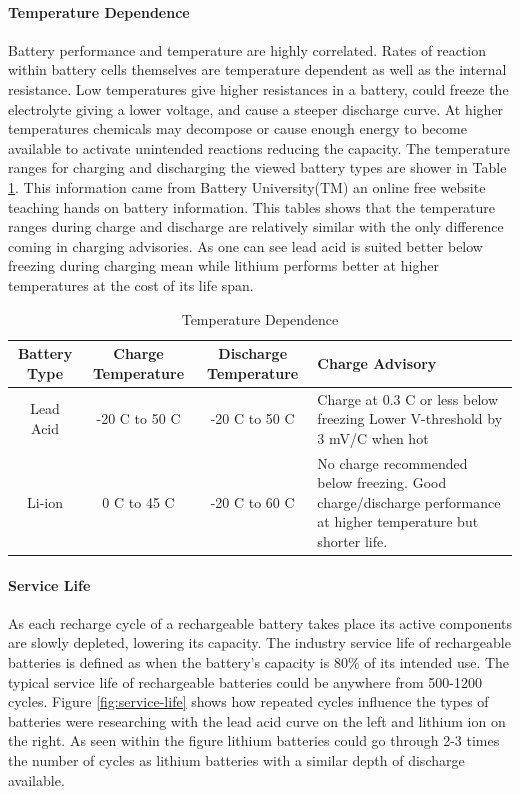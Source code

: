\paragraph{Temperature Dependence}
Battery performance and temperature are highly correlated. Rates of reaction within battery cells themselves are temperature dependent as well as the internal resistance. Low temperatures give higher resistances in a battery, could freeze the electrolyte giving a lower voltage, and cause a steeper discharge curve. At higher temperatures chemicals may decompose or cause enough energy to become available to activate unintended reactions reducing the capacity. The temperature ranges for charging and discharging the viewed battery types are shower in Table \ref{tab:temperature-dependence}. This information came from Battery University(TM) an online free website teaching hands on battery information. This tables shows that the temperature ranges during charge and discharge are relatively similar with the only difference coming in charging advisories. As one can see lead acid is suited better below freezing during charging mean while lithium performs better at higher temperatures at the cost of its life span. 
\begin{table}
\centering\scriptsize
\caption{Temperature Dependence}
\begin{tabularx}{\linewidth}{|c|c|c|X|}
\hline
Battery Type & Charge Temperature & Discharge Temperature & Charge Advisory \\ 
\hline\hline

Lead Acid     & -20 C to 50 C   & -20 C to 50 C & Charge at 0.3 C or less below freezing Lower V-threshold by 3 mV/C when hot  \\\hline
Li-ion        & 0 C to 45 C     & -20 C to 60 C & No charge recommended below freezing. Good charge/discharge performance at higher temperature but shorter life.  \\\hline

\end{tabularx}
\label{tab:temperature-dependence}
\end{table}
\paragraph{Service Life}
As each recharge cycle of a rechargeable battery takes place its active components are slowly depleted, lowering its capacity. The industry service life of rechargeable batteries is defined as when the battery's capacity is 80\% of its intended use. The typical service life of rechargeable batteries could be anywhere from 500-1200 cycles. Figure \ref{fig:service-life} shows how repeated cycles influence the types of batteries were researching with the lead acid curve on the left and lithium ion on the right. As seen within the figure lithium batteries could go through 2-3 times the number of cycles as lithium batteries with a similar depth of discharge available.

